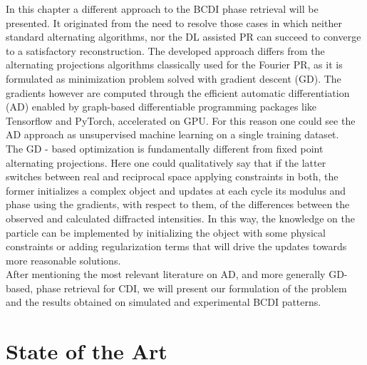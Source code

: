 
In this chapter a different approach to the BCDI phase retrieval will be presented. It originated from the need to resolve 
those cases in which neither standard alternating algorithms, nor the DL assisted PR can succeed to converge to a satisfactory 
reconstruction. The developed approach differs from the alternating projections algorithms classically used for 
the Fourier PR, as it is formulated as minimization problem solved with gradient descent (GD). The gradients however are computed 
through the efficient automatic differentiation (AD) enabled by graph-based differentiable programming packages like Tensorflow and 
PyTorch, accelerated on GPU. For this reason one could see the AD approach as unsupervised machine learning on a single training 
dataset.\\ 
The GD - based optimization is fundamentally different from fixed point alternating projections. Here one could qualitatively say 
that if the latter switches between real and reciprocal space applying constraints in both, the former initializes a 
complex object and updates at each cycle its modulus and phase using the gradients, with respect to them, of the differences 
between the observed and calculated diffracted intensities. In this way, the knowledge on the particle can be implemented 
by initializing the object with some physical constraints or adding regularization terms that will drive the updates 
towards more reasonable solutions. \\

After mentioning the most relevant literature on AD, and more generally GD-based, phase retrieval for CDI, 
we will present our formulation of the problem and the results obtained on simulated and experimental BCDI patterns. 

\section{State of the Art}
